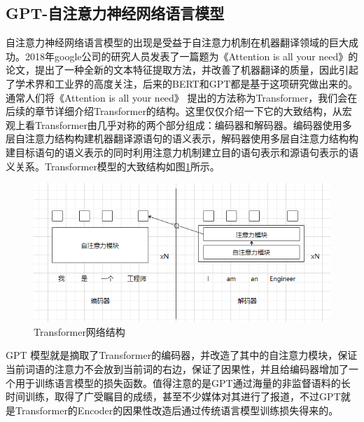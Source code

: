 \documentclass[twoside,a4paper,12pt]{book}%
\begin{document}
\subsection{GPT-自注意力神经网络语言模型}
自注意力神经网络语言模型的出现是受益于自注意力机制在机器翻译领域的巨大成功。2018年google公司的研究人员发表了一篇题为《Attention is all your need》的论文，提出了一种全新的文本特征提取方法，并改善了机器翻译的质量，因此引起了学术界和工业界的高度关注，后来的\gls{BERT}和\gls{GPT}都是基于这项研究做出来的。通常人们将《Attention is all your need》 提出的方法称为Transformer，我们会在后续的章节详细介绍Transformer的结构。这里仅仅介绍一下它的大致结构，从宏观上看Transformer由几乎对称的两个部分组成：编码器和解码器。编码器使用多层自注意力结构构建机器翻译源语句的语义表示，解码器使用多层自注意力结构构建目标语句的语义表示的同时利用注意力机制建立目的语句表示和源语句表示的语义关系。Transformer模型的大致结构如图\ref{fig:gpt1}所示。
\begin{figure}[htbp]
\begin{center}
\includegraphics[width=5.5in]{figures/gpt1.png}
\caption{Transformer网络结构}\label{fig:gpt1}
\end{center}
\end{figure}
\gls{GPT} 模型就是摘取了Transformer的编码器，并改造了其中的自注意力模块，保证当前词语的注意力不会放到当前词的右边，保证了因果性，并且给编码器增加了一个用于训练语言模型的损失函数。值得注意的是\gls{GPT}通过海量的非监督语料的长时间训练，取得了广受瞩目的成绩，甚至不少媒体对其进行了报道，不过\gls{GPT}就是Transformer的Encoder的因果性改造后通过传统语言模型训练损失得来的。
\end{document}
